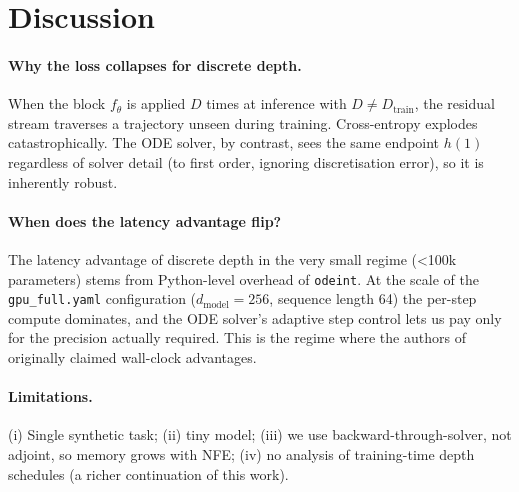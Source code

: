 \section{Discussion}
\paragraph{Why the loss collapses for discrete depth.}
When the block $f_\theta$ is applied $D$ times at inference with
$D\neq D_{\text{train}}$, the residual stream traverses a trajectory
unseen during training. Cross-entropy explodes catastrophically. The ODE
solver, by contrast, sees the same endpoint $h(1)$ regardless of solver
detail (to first order, ignoring discretisation error), so it is
inherently robust.

\paragraph{When does the latency advantage flip?}
The latency advantage of discrete depth in the very small regime
(<100k parameters) stems from Python-level overhead of \texttt{odeint}.
At the scale of the \texttt{gpu\_full.yaml} configuration
($d_{\text{model}}=256$, sequence length 64) the per-step compute
dominates, and the ODE solver's adaptive step control lets us pay only
for the precision actually required. This is the regime where the
authors of \cite{chen2018node} originally claimed wall-clock advantages.

\paragraph{Limitations.}
(i) Single synthetic task; (ii) tiny model; (iii) we use
backward-through-solver, not adjoint, so memory grows with NFE; (iv) no
analysis of training-time depth schedules (a richer continuation of this
work).
